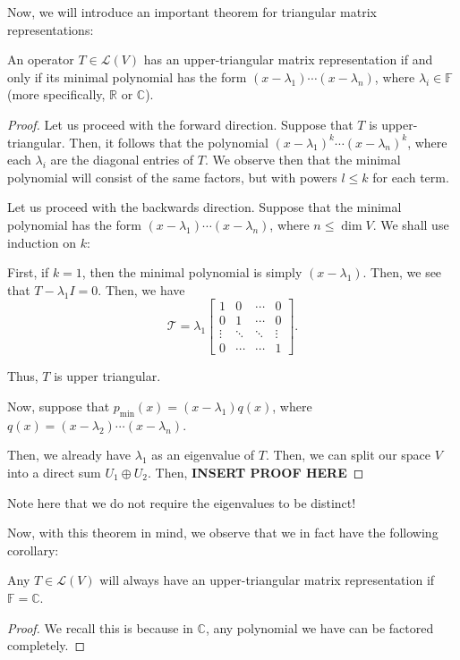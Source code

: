 \documentclass[openany]{book}
\newcommand{\CC}{\mathbb{C}}
\newcommand{\RR}{\mathbb{R}}
\begin{document}
Now, we will introduce an important theorem for triangular matrix representations:
\begin{thm}
	An operator $T \in \mathcal L(V)$ has an upper-triangular matrix representation if and only if its minimal polynomial has the form $(x-\lambda_1)\cdots(x-\lambda_n)$, where $\lambda_i \in \mathbb{F}$ (more specifically, $\RR$ or $\CC$).
\end{thm}
\begin{proof}
	Let us proceed with the forward direction. Suppose that $T$ is upper-triangular. Then, it follows that the polynomial $(x-\lambda_1)^{k}\cdots(x-\lambda_n)^{k}$, where each $\lambda_i$ are the diagonal entries of $T$. We observe then that the minimal polynomial will consist of the same factors, but with powers $l \leq k$ for each term.
	
	Let us proceed with the backwards direction. Suppose that the minimal polynomial has the form $(x-\lambda_1)\cdots(x-\lambda_n)$, where $n \leq \dim V$. We shall use induction on $k$:
	
	First, if $k = 1$, then the minimal polynomial is simply $(x-\lambda_1)$. Then, we see that $T - \lambda_1 I = 0$. Then, we have
	\begin{equation*}
		\mathcal T = \lambda_1
		\begin{bmatrix}
			1 & 0 & \cdots & 0 \\ 0 & 1 & \cdots & 0 \\ \vdots & \ddots & \ddots & \vdots \\ 0 & \cdots & \cdots &1
		\end{bmatrix}.
	\end{equation*}

	Thus, $T$ is upper triangular.
	
	Now, suppose that $p_{\mathrm{min}} (x) = (x-\lambda_1) q(x)$, where $q(x) = (x-\lambda_2) \cdots(x-\lambda_n)$.
	
	Then, we already have $\lambda_1$ as an eigenvalue of $T$. Then, we can split our space $V$ into a direct sum $U_{1} \oplus U_{2}$. Then, \textbf{INSERT PROOF HERE}
\end{proof}
Note here that we do not require the eigenvalues to be distinct!

Now, with this theorem in mind, we observe that we in fact have the following corollary:
\begin{cor}
	Any $T \in \mathcal L(V)$ will always have an upper-triangular matrix representation if $\mathbb{F} = \CC$.
\end{cor}
\begin{proof}
	We recall this is because in $\CC$, any polynomial we have can be factored completely.
\end{proof}
\end{document}
